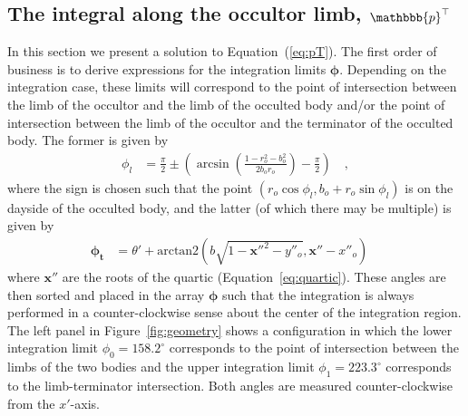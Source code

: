 \documentclass[modern]{aastex62}
\newcommand{\BS}[1]{\ensuremath{\pmb{#1}}}
\newcommand{\pT}{\ensuremath{\mathbbb{p}^\top}}
\begin{document}
\subsection{The integral along the occultor limb, $\pT$}
\label{sec:pT}
%
In this section we present a solution to Equation~(\ref{eq:pT}). The first
order of business is to derive expressions for the integration limits
$\BS{\phi}$. Depending on the integration case, these limits will correspond
to the point of intersection between the limb of the occultor and the
limb of the occulted body and/or the point of intersection between the limb
of the occultor and the terminator of the occulted body.
The former is given by
\citep[c.f. Equation~24 in][]{Luger2019}
%
\begin{align}
    \phi_l & = \frac{\pi}{2} \pm \left(\arcsin\left(\frac{1 - r_o ^ 2 - b_o ^ 2}{2 b_o r_o}\right) - \frac{\pi}{2}\right)
    \quad,
\end{align}
%
where the sign is chosen such that the point
$(r_o\cos\phi_l, b_o + r_o\sin\phi_l)$ is on the dayside of the occulted body,
and the latter (of which there may be multiple) is given by
%
%
%
\begin{align}
    \BS{\phi_t} & =
    \theta' + \text{arctan2}\left(b\sqrt{1 - \BS{x''}^2 - y''_o}, \BS{x''} - x''_o\right)
    \quad
\end{align}
%
where $\BS{x''}$ are the roots of the quartic (Equation~\ref{eq:quartic}).
These angles are then sorted and placed in the array $\BS{\phi}$ such that
the integration is always performed in a counter-clockwise sense about
the center of the integration region.
%
The left panel in Figure~\ref{fig:geometry} shows a configuration in which
the lower integration limit $\phi_0 = 158.2^\circ$ corresponds to the
point of intersection between the limbs of the two bodies and the upper
integration limit $\phi_1 = 223.3^\circ$ corresponds to the
limb-terminator intersection. Both angles are measured counter-clockwise
from the $x'$-axis.
\end{document}
